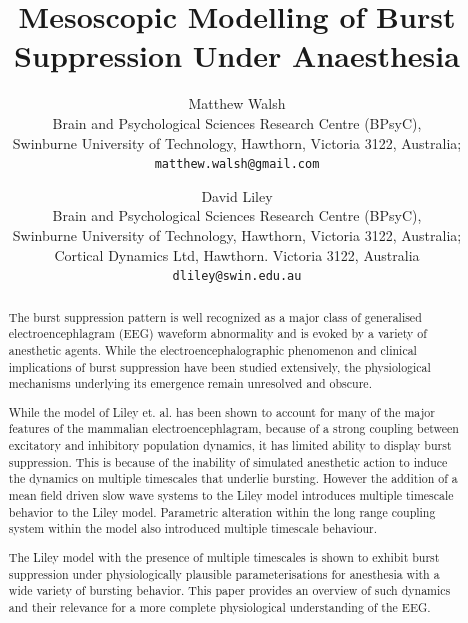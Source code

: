 \documentclass[a4paper,12pt]{article}
\begin{document}

\title{Mesoscopic Modelling of Burst Suppression Under Anaesthesia}
\author{Matthew Walsh\\
   \small Brain and Psychological Sciences Research Centre (BPsyC),\\
   \small Swinburne University of Technology, Hawthorn, Victoria 3122, Australia; \\
   \texttt{matthew.walsh@gmail.com}\\
  \and
    David Liley\\
   \small  Brain and Psychological Sciences Research Centre (BPsyC),\\
   \small Swinburne University of Technology, Hawthorn, Victoria 3122, Australia; \\
   \small Cortical Dynamics Ltd, Hawthorn. Victoria 3122, Australia\\
   \texttt{dliley@swin.edu.au}}
\maketitle

\begin{abstract}
The burst suppression pattern is well recognized as
a major class of generalised electroencephlagram (EEG) waveform abnormality 
and is evoked by a variety of anesthetic agents. 
While the electroencephalographic phenomenon and clinical
implications of burst suppression have been studied extensively, the physiological mechanisms
underlying its emergence remain unresolved and obscure. 

While the model of Liley et. al. has been shown to account for many of the major features of the 
mammalian electroencephlagram, because of a strong coupling between excitatory and inhibitory population dynamics,  
it has limited ability to display burst suppression. This is because of the inability of simulated anesthetic action 
to induce the dynamics on multiple timescales that underlie bursting.
However the addition of a mean field driven slow wave systems to the Liley model introduces 
multiple timescale behavior to the Liley model. Parametric alteration within the long range coupling system within the model also introduced multiple timescale behaviour.

The Liley model with the presence of multiple timescales is shown to exhibit burst suppression under physiologically 
plausible parameterisations for anesthesia with a wide variety of bursting behavior. 
This paper provides an overview of such dynamics and their relevance for a more 
complete physiological understanding of the EEG.

\end{abstract}
\end{document}
